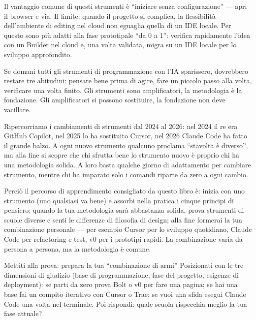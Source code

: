 Il vantaggio comune di questi strumenti è “iniziare senza configurazione” — apri il browser e via. Il limite: quando il progetto si complica, la flessibilità dell'ambiente di editing nel cloud non eguaglia quella di un IDE locale. Per questo sono più adatti alla fase prototipale “da 0 a 1”: verifica rapidamente l'idea con un Builder nel cloud e, una volta validata, migra su un IDE locale per lo sviluppo approfondito.


Se domani tutti gli strumenti di programmazione con l'IA sparissero, dovrebbero restare tre abitudini: pensare bene prima di agire, fare un piccolo passo alla volta, verificare una volta finito. Gli strumenti sono amplificatori, la metodologia è la fondazione. Gli amplificatori si possono sostituire, la fondazione non deve vacillare.

Ripercorriamo i cambiamenti di strumenti dal 2024 al 2026: nel 2024 il re era GitHub Copilot, nel 2025 lo ha sostituito Cursor, nel 2026 Claude Code ha fatto il grande balzo. A ogni nuovo strumento qualcuno proclama “stavolta è diverso”, ma alla fine si scopre che chi sfrutta bene lo strumento nuovo è proprio chi ha una metodologia solida. A loro basta qualche giorno di adattamento per cambiare strumento, mentre chi ha imparato solo i comandi riparte da zero a ogni cambio.

Perciò il percorso di apprendimento consigliato da questo libro è: inizia con uno strumento (uno qualsiasi va bene) e assorbi nella pratica i cinque principi di pensiero; quando la tua metodologia sarà abbastanza solida, prova strumenti di scuole diverse e senti le differenze di filosofia di design; alla fine formerai la tua combinazione personale — per esempio Cursor per lo sviluppo quotidiano, Claude Code per refactoring e test, v0 per i prototipi rapidi. La combinazione varia da persona a persona, ma la metodologia è comune.

\begin{tcbpractice}{Mettiti alla prova: prepara la tua “combinazione di armi”}
Posizionati con le tre dimensioni di giudizio (base di programmazione, fase del progetto, esigenze di deployment): se parti da zero prova Bolt o v0 per fare una pagina; se hai una base fai un compito iterativo con Cursor o Trae; se vuoi una sfida esegui Claude Code una volta nel terminale. Poi rispondi: quale scuola rispecchia meglio la tua fase attuale?

\end{tcbpractice}

